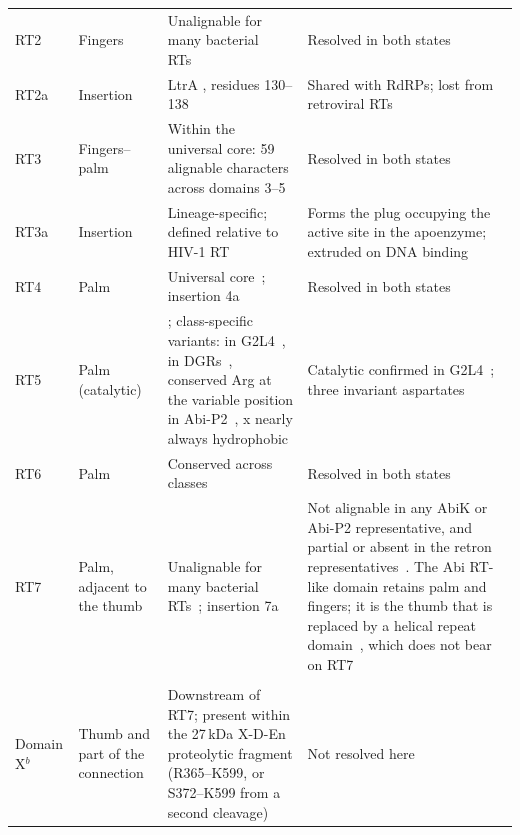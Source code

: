 \begin{longtable}{@{}L{0.13\rtwd} L{0.18\rtwd} L{0.35\rtwd} L{0.34\rtwd}@{}}
RT2 & Fingers
  & Unalignable for many bacterial RTs~\cite{simon2008}
  & Resolved in both states~\cite{yang2025} \\[3pt]

RT2a & Insertion
  & LtrA , residues 130--138~\cite{blocker2005}
  & Shared with RdRPs; lost from retroviral RTs~\cite{yang2025} \\[3pt]

RT3 & Fingers--palm
  & Within the universal core: 59 alignable characters across domains
    3--5~\cite{simon2008}
  & Resolved in both states~\cite{yang2025} \\[3pt]

RT3a & Insertion
  & Lineage-specific; defined relative to HIV-1 RT~\cite{blocker2005}
  & Forms the plug occupying the active site in the apoenzyme; extruded on DNA
    binding~\cite{yang2025} \\[3pt]

RT4 & Palm & Universal core~\cite{simon2008}; insertion 4a~\cite{blocker2005}
  & Resolved in both states~\cite{yang2025} \\[3pt]

RT5 & Palm (catalytic)
    & ; class-specific variants:  in G2L4~\cite{toro2014},
     in DGRs~\cite{toro2014}, conserved Arg at the variable position in
    Abi-P2~\cite{simon2008}, x nearly always hydrophobic
    & Catalytic  confirmed in G2L4~\cite{yang2025}; three invariant
    aspartates~\cite{arkhipova2023} \\[3pt]

RT6 & Palm & Conserved across classes~\cite{simon2008}
  & Resolved in both states~\cite{yang2025} \\[3pt]

RT7 & Palm, adjacent to the thumb
  & Unalignable for many bacterial RTs~\cite{simon2008}; insertion 7a~\cite{blocker2005}
  & Not alignable in any AbiK or Abi-P2 representative, and partial or absent in
    the retron representatives~\cite{simon2008}. The Abi RT-like domain retains
    palm and fingers; it is the thumb that is replaced by a helical repeat
    domain~\cite{figiel2022}, which does not bear on RT7 \\[3pt]

\addlinespace
{}\\
\addlinespace

Domain X$^{b}$ & Thumb and part of the connection
  & Downstream of RT7; present within the 27\,kDa X-D-En proteolytic fragment
    (R365--K599, or S372--K599 from a second cleavage)~\cite{blocker2005}
  & Not resolved here \\[3pt]


\end{longtable}
